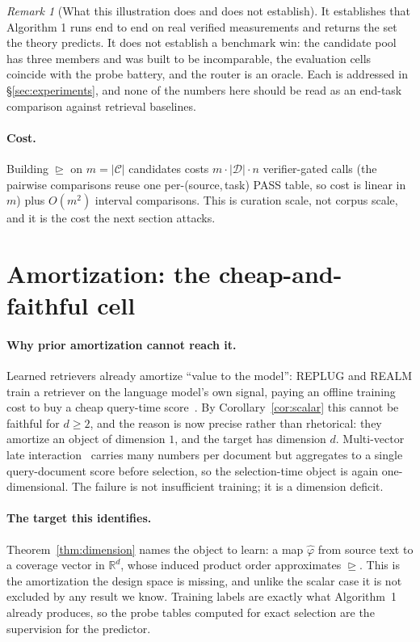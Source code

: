 \documentclass[11pt]{article}
\theoremstyle{plain}
\theoremstyle{definition}
\theoremstyle{remark}
\newtheorem{remark}{Remark}
\newcommand{\Dcal}{\mathcal{D}}
\newcommand{\Ccal}{\mathcal{C}}
\begin{document}
\begin{remark}[What this illustration does and does not establish]
It establishes that Algorithm 1 runs end to end on real verified measurements and returns the set
the theory predicts. It does not establish a benchmark win: the candidate pool has three members
and was built to be incomparable, the evaluation cells coincide with the probe battery, and the
router is an oracle. Each is addressed in \S\ref{sec:experiments}, and none of the numbers here
should be read as an end-task comparison against retrieval baselines.
\end{remark}

\paragraph{Cost.}
Building $\trianglerighteq$ on $m=|\Ccal|$ candidates costs $m \cdot |\Dcal| \cdot n$
verifier-gated calls (the pairwise comparisons reuse one per-(source,\,task) PASS table, so cost is
linear in $m$) plus $O(m^2)$ interval comparisons. This is curation scale, not corpus scale, and it
is the cost the next section attacks.

\section{Amortization: the cheap-and-faithful cell}
\label{sec:amortize}

\paragraph{Why prior amortization cannot reach it.}
Learned retrievers already amortize ``value to the model'': REPLUG and REALM train a retriever on
the language model's own signal, paying an offline training cost to buy a cheap query-time
score~\citep{shi2023replug,guu2020realm}. By Corollary~\ref{cor:scalar} this cannot be faithful for
$d \ge 2$, and the reason is now precise rather than rhetorical: they amortize an object of
dimension $1$, and the target has dimension $d$. Multi-vector late
interaction~\citep{khattab2020colbert} carries many numbers per document but aggregates to a single
query-document score before selection, so the selection-time object is again one-dimensional. The
failure is not insufficient training; it is a dimension deficit.

\paragraph{The target this identifies.}
Theorem~\ref{thm:dimension} names the object to learn: a map $\widehat{\varphi}$ from source text
to a coverage vector in $\mathbb{R}^d$, whose induced product order approximates
$\trianglerighteq$. This is the amortization the design space is missing, and unlike the scalar case
it is not excluded by any result we know. Training labels are exactly what Algorithm~1 already
produces, so the probe tables computed for exact selection are the supervision for the predictor.
\end{document}
